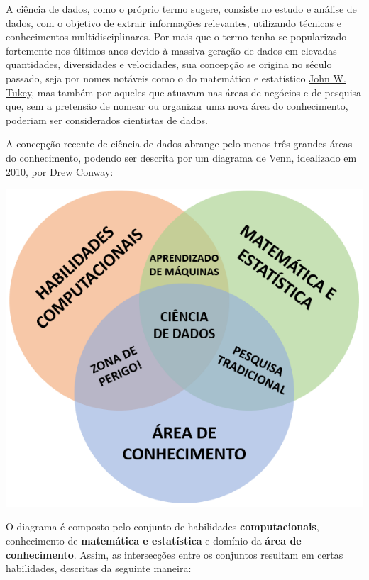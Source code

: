 \documentclass[
  brazilian,
]{book}
\let\origfigure\figure
\let\endorigfigure\endfigure
\renewenvironment{figure}[1][2] {
    \expandafter\origfigure\expandafter[H]
} {
    \endorigfigure
}
\begin{document}
A ciência de dados, como o próprio termo sugere, consiste no estudo e análise de dados, com o objetivo de extrair informações relevantes, utilizando técnicas e conhecimentos multidisciplinares. Por mais que o termo tenha se popularizado fortemente nos últimos anos devido à massiva geração de dados em elevadas quantidades, diversidades e velocidades, sua concepção se origina no século passado, seja por nomes notáveis como o do matemático e estatístico \href{http://www.ru.ac.bd/wp-content/uploads/sites/25/2019/03/102_05_01_Tukey-Exploratory-Data-Analysis-1977.pdf}{John W. Tukey}, mas também por aqueles que atuavam nas áreas de negócios e de pesquisa que, sem a pretensão de nomear ou organizar uma nova área do conhecimento, poderiam ser considerados cientistas de dados.

A concepção recente de ciência de dados abrange pelo menos três grandes áreas do conhecimento, podendo ser descrita por um diagrama de Venn, idealizado em 2010, por \href{http://drewconway.com/zia/2013/3/26/the-data-science-venn-diagram}{Drew Conway}:

\begin{figure}

{\centering \includegraphics[width=0.5\linewidth]{imagens/venn_pt} 

}

\caption{Diagrama de Venn da ciência de dados.}\label{fig:venn}
\end{figure}

O diagrama é composto pelo conjunto de habilidades \textbf{computacionais}, conhecimento de \textbf{matemática e estatística} e domínio da \textbf{área de conhecimento}. Assim, as intersecções entre os conjuntos resultam em certas habilidades, descritas da seguinte maneira:
\end{document}
